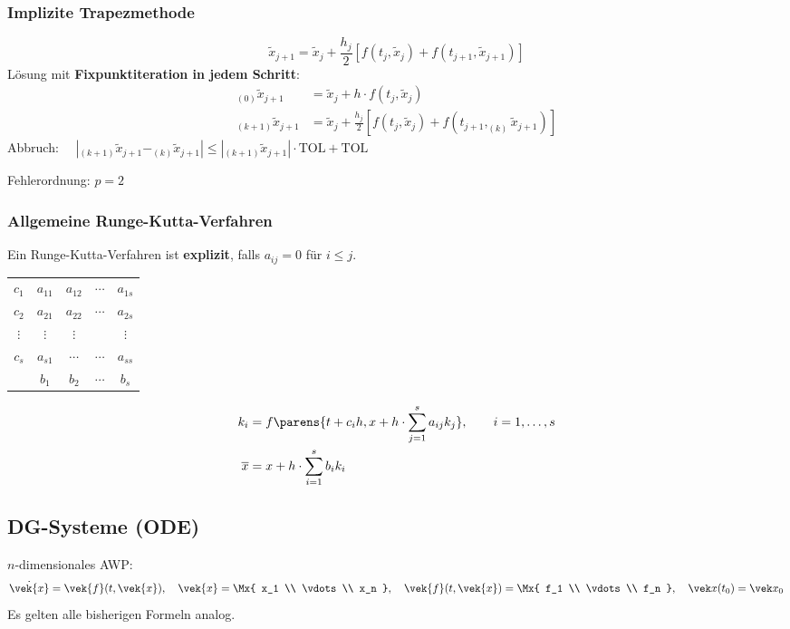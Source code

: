 		\subsubsection{Implizite Trapezmethode}
			\[
				\tilde x_{j+1}=\tilde x_j + \frac{h_j}{2}\left[ f(t_j, \tilde x_j)+f(t_{j+1},\tilde x_{j+1})\right]
			\]
			Lösung mit \textbf{Fixpunktiteration in jedem Schritt}:
			\begin{align*}
				_{(0)} \tilde x_{j+1} &= \tilde x_j + h \cdot f(t_j, \tilde x_j) \tag{Euler} \\
				_{(k+1)}\tilde x_{j+1} &= \tilde x_j + \frac{h_j}{2}\left[ f(t_j,\tilde x_j) + f(t_{j+1}, _{(k)}\tilde x_{j+1})\right]
			\end{align*}
			Abbruch: $\quad |_{(k+1)}\tilde x_{j+1} - _{(k)} \tilde x_{j+1}| \leq |_{(k+1)}\tilde x_{j+1}|\cdot \mathrm{TOL}+\mathrm{TOL}$

			Fehlerordnung: $p=2$

		\subsubsection{Allgemeine Runge-Kutta-Verfahren}
			\label{allgrungekutta}
			Ein Runge-Kutta-Verfahren ist \textbf{explizit}, falls $a_{ij}=0$ für $i \leq j$.

			\hspace{5ex}
			\begin{tabular}
				{c|cccc} $c_1$ & $a_{11}$ & $a_{12}$& $\cdots$& $a_{1s}$ \\
				$c_2$ & $a_{21}$ & $a_{22}$ & $\cdots$& $a_{2s}$ \\
				$\vdots$ & $\vdots$ & $\vdots$ & & $\vdots$ \\
				$c_s$ & $a_{s1}$ & $\cdots$ & $\cdots$ & $a_{ss}$ \\
				\hline & $b_1$ & $b_2$ & $\cdots$ & $b_s$\\
			\end{tabular}

			\begin{align*}
				k_i &= f \parens{t+c_ih , x+h\cdot \sum_{j=1}^s a_{ij}k_j}, \qquad i=1, \dots, s \\
				\overline{x} &= x + h \cdot \sum\limits_{i=1}^s b_ik_i
			\end{align*}

	\subsection{DG-Systeme (ODE)}
		$n$-dimensionales AWP:
		\[
			\dot{\vek{x}} = \vek{f}(t,\vek{x}), \quad \vek{x} = \Mx{
				x_1 \\ \vdots \\ x_n
			}, \quad \vek{f}(t,\vek{x}) = \Mx{
				f_1 \\ \vdots \\ f_n
			}, \quad \vek x(t_0) = \vek x_0
		\]
		Es gelten alle bisherigen Formeln analog.

